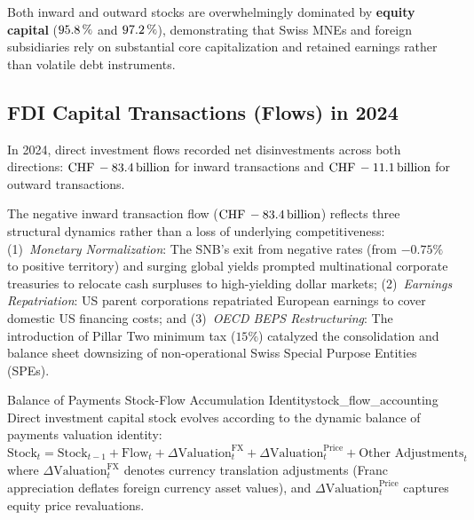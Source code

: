 Both inward and outward stocks are overwhelmingly dominated by \textbf{equity capital} ($95.8\,\%$ and $97.2\,\%$), demonstrating that Swiss MNEs and foreign subsidiaries rely on substantial core capitalization and retained earnings rather than volatile debt instruments.

\subsection{FDI Capital Transactions (Flows) in 2024}

In 2024, direct investment flows recorded net disinvestments across both directions: \textbf{$\text{CHF}\,-83.4\,\text{billion}$} for inward transactions and \textbf{$\text{CHF}\,-11.1\,\text{billion}$} for outward transactions.

\begin{remarkbox}
The negative inward transaction flow ($\text{CHF}\,-83.4\,\text{billion}$) reflects three structural dynamics rather than a loss of underlying competitiveness: (1)~\textit{Monetary Normalization}: The SNB's exit from negative rates (from $-0.75\%$ to positive territory) and surging global yields prompted multinational corporate treasuries to relocate cash surpluses to high-yielding dollar markets; (2)~\textit{Earnings Repatriation}: US parent corporations repatriated European earnings to cover domestic US financing costs; and (3)~\textit{OECD BEPS Restructuring}: The introduction of Pillar Two minimum tax ($15\%$) catalyzed the consolidation and balance sheet downsizing of non-operational Swiss Special Purpose Entities (SPEs).
\end{remarkbox}

\begin{theorem}{Balance of Payments Stock-Flow Accumulation Identity}{stock_flow_accounting}
Direct investment capital stock evolves according to the dynamic balance of payments valuation identity:
\begin{equation}
    \text{Stock}_t = \text{Stock}_{t-1} + \text{Flow}_t + \Delta \text{Valuation}_t^{\text{FX}} + \Delta \text{Valuation}_t^{\text{Price}} + \text{Other Adjustments}_t
\end{equation}
where $\Delta \text{Valuation}_t^{\text{FX}}$ denotes currency translation adjustments (Franc appreciation deflates foreign currency asset values), and $\Delta \text{Valuation}_t^{\text{Price}}$ captures equity price revaluations.
\end{theorem}
